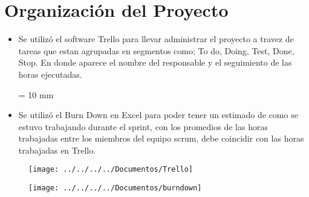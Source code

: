 \chapter{Organización del Proyecto}
\begin{itemize}
	\item Se utilizó el software Trello para llevar administrar el proyecto a travez de tareas que estan agrupadas en segmentos como; To do, Doing, Test, Done, Stop. En donde aparece el nombre del responsable y el seguimiento de las horas ejecutadas.
	\par
	\parskip = 10 mm
	\item Se utilizó el Burn Down en Excel para poder tener un estimado de como se estuvo trabajando durante el sprint, con los promedios de las horas trabajadas entre los miembros del equipo scrum, debe coincidir con las horas trabajadas en Trello.
\end{itemize}
\begin{figure}
	\texttt{[image: ../../../../Documentos/Trello]}
\end{figure}
\par
\begin{figure}
	\texttt{[image: ../../../../Documentos/burndown]}
\end{figure}
